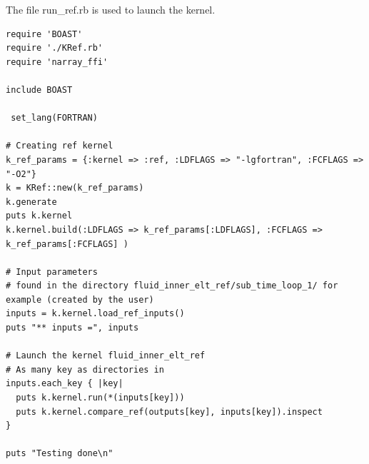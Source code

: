 \documentclass[10pt,twoside]{article}   	%
\begin{document}
The file run\_ref.rb is used to launch the kernel. 

\begin{lstlisting}[caption=run\_ref.rb]
require 'BOAST'
require './KRef.rb'
require 'narray_ffi'

include BOAST

 set_lang(FORTRAN)

# Creating ref kernel
k_ref_params = {:kernel => :ref, :LDFLAGS => "-lgfortran", :FCFLAGS => "-O2"}
k = KRef::new(k_ref_params)
k.generate
puts k.kernel
k.kernel.build(:LDFLAGS => k_ref_params[:LDFLAGS], :FCFLAGS => k_ref_params[:FCFLAGS] )

# Input parameters 
# found in the directory fluid_inner_elt_ref/sub_time_loop_1/ for example (created by the user)
inputs = k.kernel.load_ref_inputs()
puts "** inputs =", inputs

# Launch the kernel fluid_inner_elt_ref
# As many key as directories in 
inputs.each_key { |key|
  puts k.kernel.run(*(inputs[key]))
  puts k.kernel.compare_ref(outputs[key], inputs[key]).inspect
}

puts "Testing done\n"
\end{lstlisting}
\end{document}
